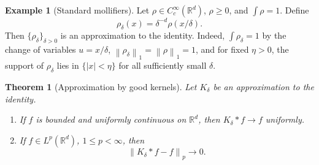 \documentclass[11pt,openany]{book}
\numberwithin{equation}{chapter}
\theoremstyle{definition}
\newtheorem{example}[definition]{Example}
\theoremstyle{plain}
\newtheorem{theorem}[definition]{Theorem}
\theoremstyle{remark}
\newcommand{\R}{\mathbb{R}}
\newcommand{\1}{\mathbf{1}}
\newcommand{\abs}[1]{\left\lvert #1\right\rvert}
\newcommand{\norm}[1]{\left\lVert #1\right\rVert}
\begin{document}
\begin{example}[Standard mollifiers]
Let \(\rho\in C_c^\infty(\R^d)\), \(\rho\ge0\), and \(\int\rho=1\).  Define
\[
    \rho_\delta(x)=\delta^{-d}\rho(x/\delta).
\]
Then \(\{\rho_\delta\}_{\delta>0}\) is an approximation to the identity.  Indeed, \(\int\rho_\delta=1\) by the change of variables \(u=x/\delta\), \(\norm{\rho_\delta}_1=\norm{\rho}_1=1\), and for fixed \(\eta>0\), the support of \(\rho_\delta\) lies in \(\{\abs{x}<\eta\}\) for all sufficiently small \(\delta\).
\end{example}

\begin{theorem}[Approximation by good kernels]
Let \(K_\delta\) be an approximation to the identity.
\begin{enumerate}[label=(\roman*)]
    \item If \(f\) is bounded and uniformly continuous on \(\R^d\), then \(K_\delta*f\to f\) uniformly.
    \item If \(f\in L^p(\R^d)\), \(1\le p<\infty\), then
    \[
        \norm{K_\delta*f-f}_p\to0.
    \]
\end{enumerate}
\end{theorem}
\end{document}
